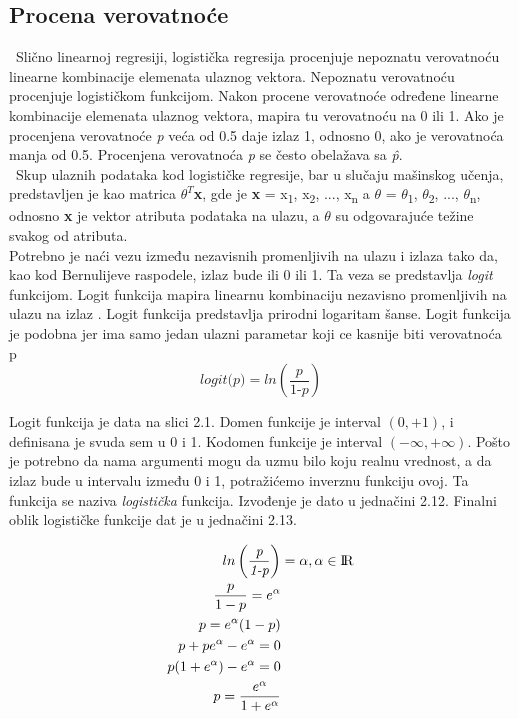 \documentclass[a4paper,12pt]{report}
\begin{document}
\subsection{Procena verovatnoće}

\ Slično linearnoj regresiji, logistička regresija procenjuje nepoznatu verovatnoću linearne kombinacije elemenata ulaznog vektora. Nepoznatu verovatnoću procenjuje logističkom funkcijom. Nakon procene verovatnoće određene linearne kombinacije elemenata ulaznog vektora, mapira tu verovatnoću na 0 ili 1. Ako je procenjena verovatnoće \textit{p} veća od 0.5 daje izlaz 1, odnosno 0, ako je verovatnoća manja od 0.5. Procenjena verovatnoća \textit{p} se često obelažava sa \textit{\^{p}}. \\

\ Skup ulaznih podataka kod logističke regresije, bar u slučaju mašinskog učenja, predstavljen je kao matrica \textbf{$\theta^T$x}, gde je \textbf{x} = {x\textsubscript{1}, x\textsubscript{2}, ..., x\textsubscript{n}} a $\theta$ = {$\theta$\textsubscript{1}, $\theta$\textsubscript{2}, ..., $\theta$\textsubscript{n}}, odnosno \textbf{x} je vektor atributa podataka na ulazu, a $\theta$ su odgovarajuće težine svakog od atributa. \\

Potrebno je naći vezu između nezavisnih promenljivih na ulazu i izlaza tako da, kao kod Bernulijeve raspodele, izlaz bude ili 0 ili 1. Ta veza se predstavlja \textit{logit} funkcijom. Logit funkcija mapira linearnu kombinaciju nezavisno promenljivih na ulazu na izlaz . Logit funkcija predstavlja prirodni logaritam šanse. Logit funkcija je podobna jer ima samo jedan ulazni parametar koji ce kasnije biti verovatnoća p \\
\begin{equation}
\textit{logit(p)} = ln \left( \frac{\textit{p}}{\textit{1-p}} \right)
\end{equation}

Logit funkcija je data na slici 2.1. Domen funkcije je interval $ (0, +1) $, i definisana je svuda sem u 0 i 1. Kodomen funkcije je interval 
$ (-\infty, +\infty) $. Pošto je potrebno da nama argumenti mogu da uzmu bilo koju realnu vrednost, a da izlaz bude u intervalu između 0 i 1, potražićemo inverznu funkciju ovoj. Ta funkcija se naziva \textit{logistička} funkcija. Izvođenje je dato u jednačini 2.12. Finalni oblik logističke funkcije dat je u jednačini 2.13.

\begin{equation}
\begin{split}
ln \left( \frac{\textit{p}}{\textit{1-p}} \right) & = \alpha, \alpha \in \rm I\!R\\  
	\frac{p}{1-p} = e^\alpha\\
	p = e^\alpha(1-p)\\
	p + pe^\alpha - e^\alpha  = 0\\
	p(1+e^\alpha) - e^\alpha  = 0\\
	p  = \frac{e^\alpha}{1+e^\alpha}
\end{split}
\end{equation}
\end{document}
